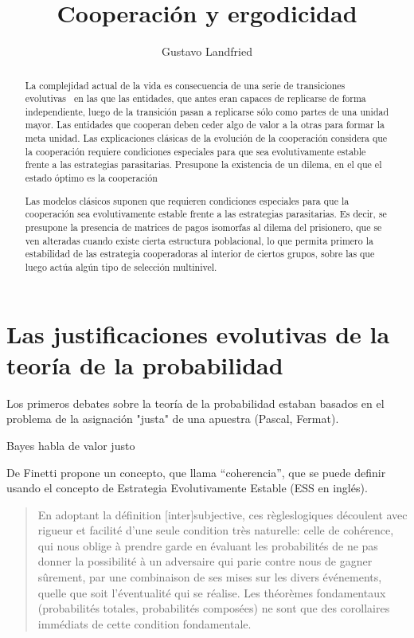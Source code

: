 \documentclass[a4paper,10pt]{article}
\title{Cooperación y ergodicidad}
\author{Gustavo Landfried}
\begin{document}
\maketitle

\begin{abstract}

La complejidad actual de la vida es consecuencia de una serie de transiciones evolutivas~\cite{maynardSmith1995-majorTransitions} en las que las entidades, que antes eran capaces de replicarse de forma independiente, luego de la transición pasan a replicarse sólo como partes de una unidad mayor.
Las entidades que cooperan deben ceder algo de valor a la otras para formar la meta unidad.
Las explicaciones clásicas de la evolución de la cooperación considera que la cooperación requiere condiciones especiales para que sea evolutivamente estable frente a las estrategias parasitarias.
Presupone la existencia de un dilema, en el que el estado óptimo es la cooperación


Las modelos clásicos suponen que 
requieren condiciones especiales para que la cooperación sea evolutivamente estable frente a las estrategias parasitarias.
Es decir, se presupone la presencia de matrices de pagos isomorfas al dilema del prisionero, que se ven alteradas cuando existe cierta estructura poblacional, lo que permita primero la estabilidad de las estrategia cooperadoras al interior de ciertos grupos, sobre las que luego actúa algún tipo de selección multinivel.


\end{abstract}

\section{Las justificaciones evolutivas de la teoría de la probabilidad}

Los primeros debates sobre la teoría de la probabilidad estaban basados en el problema de la asignación "justa" de una apuestra (Pascal, Fermat).

Bayes habla de valor justo



De Finetti propone un concepto, que llama ``coherencia'', que se puede definir usando el concepto de Estrategia Evolutivamente Estable (ESS en inglés).

\begin{quotation}
En adoptant la définition [inter]subjective, ces règleslogiques découlent avec rigueur et facilité d’une seule condition très naturelle: celle de cohérence, qui nous oblige à prendre garde en évaluant les probabilités de ne pas donner la possibilité à un adversaire qui parie contre nous de gagner sûrement, par une  combinaison de ses mises sur les divers événements, quelle que soit l’éventualité qui se réalise.
Les théorèmes fondamentaux (probabilités totales, probabilités composées) ne sont que des corollaires immédiats de cette condition fondamentale.
\end{quotation}
\end{document}
